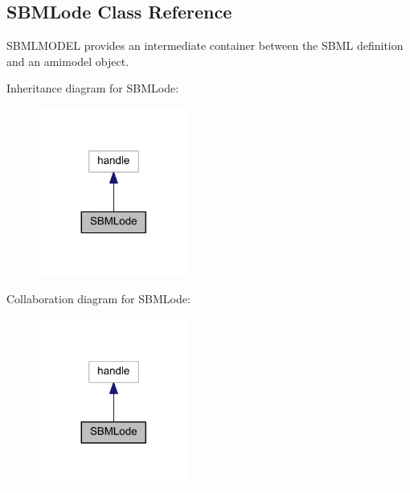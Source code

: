 \hypertarget{class_s_b_m_lode}{}\subsection{S\+B\+M\+Lode Class Reference}
\label{class_s_b_m_lode}


S\+B\+M\+L\+M\+O\+D\+E\+L provides an intermediate container between the S\+B\+M\+L definition and an amimodel object.  




Inheritance diagram for S\+B\+M\+Lode\+:\nopagebreak
\begin{figure}[H]
\begin{center}
\leavevmode
\includegraphics[width=140pt]{class_s_b_m_lode__inherit__graph}
\end{center}
\end{figure}


Collaboration diagram for S\+B\+M\+Lode\+:\nopagebreak
\begin{figure}[H]
\begin{center}
\leavevmode
\includegraphics[width=140pt]{class_s_b_m_lode__coll__graph}
\end{center}
\end{figure}
